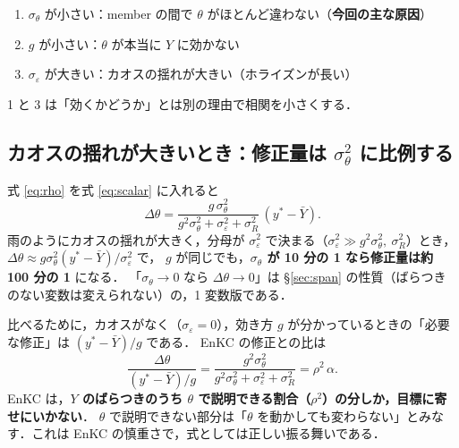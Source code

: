 \documentclass[dvipdfmx,a4paper,10.5pt]{jarticle}
\numberwithin{equation}{section}
\begin{document}
\begin{point}[title=相関が小さくなる 3 つの理由]
\begin{enumerate}
  \item $\sigma_\theta$ が小さい：member の間で $\theta$ がほとんど違わない（\textbf{今回の主な原因}）
  \item $g$ が小さい：$\theta$ が本当に $Y$ に効かない
  \item $\sigma_\varepsilon$ が大きい：カオスの揺れが大きい（ホライズンが長い）
\end{enumerate}
1 と 3 は「効くかどうか」とは別の理由で相関を小さくする．
\end{point}

\subsection{カオスの揺れが大きいとき：修正量は $\sigma_\theta^2$ に比例する}
式 \eqref{eq:rho} を式 \eqref{eq:scalar} に入れると
\begin{equation}
  \Delta\theta = \frac{g\,\sigma_\theta^2}{g^2\sigma_\theta^2+\sigma_\varepsilon^2+\sigma_R^2}\,(y^*-\bar Y).
  \label{eq:sq}
\end{equation}
雨のようにカオスの揺れが大きく，分母が $\sigma_\varepsilon^2$ で決まる（$\sigma_\varepsilon^2 \gg g^2\sigma_\theta^2,\ \sigma_R^2$）とき，
$\Delta\theta \approx g\sigma_\theta^2(y^*-\bar Y)/\sigma_\varepsilon^2$ で，
$g$ が同じでも，\textbf{$\sigma_\theta$ が 10 分の 1 なら修正量は約 100 分の 1} になる．
「$\sigma_\theta\to0$ なら $\Delta\theta\to0$」は \S\ref{sec:span} の性質（ばらつきのない変数は変えられない）の，1 変数版である．

比べるために，カオスがなく（$\sigma_\varepsilon=0$），効き方 $g$ が分かっているときの「必要な修正」は $(y^*-\bar Y)/g$ である．
EnKC の修正との比は
\begin{equation}
  \frac{\Delta\theta}{(y^*-\bar Y)/g} = \frac{g^2\sigma_\theta^2}{g^2\sigma_\theta^2+\sigma_\varepsilon^2+\sigma_R^2}
  = \rho^2\,\alpha .
\end{equation}
EnKC は，\textbf{$Y$ のばらつきのうち $\theta$ で説明できる割合（$\rho^2$）の分しか，目標に寄せにいかない}．
$\theta$ で説明できない部分は「$\theta$ を動かしても変わらない」とみなす．これは EnKC の慎重さで，式としては正しい振る舞いである．
\end{document}
